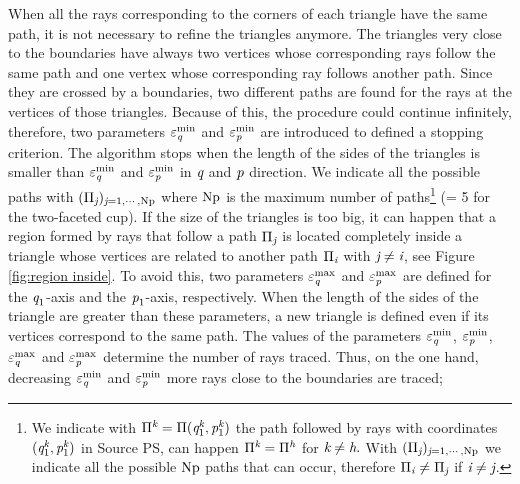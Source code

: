 When all the rays corresponding to the corners of each triangle have the same path, it is not necessary to refine the triangles anymore.
The triangles very close to the boundaries have always two vertices whose corresponding rays follow the same path and one vertex whose corresponding ray follows another path.
Since they are crossed by a boundaries, two different paths are found for the rays at the vertices of those triangles. 
Because of this, the procedure could continue infinitely, therefore, two parameters $\varepsilon_{\textit{q}}^\textrm{min}$ and $\varepsilon_{\textit{p}}^\textrm{min}$ are introduced to defined a stopping criterion.
The algorithm stops when the length of the sides of the triangles is smaller than $\varepsilon_{\textit{q}}^\textrm{min}$ and $\varepsilon_{\textit{p}}^\textrm{min}$ in $\textit{q}$ and $\textit{p}$ direction.
We indicate all the possible paths with $(\Pi_{\textit{j}})_{\textit{j}=1, \cdots, \textrm{Np}}$ where $\textrm{Np}$ is the maximum number of paths\footnote{We indicate with $\Pi^{\textit{k}} = \Pi(\textit{q}_1^{\textit{k}},\textit{p}_1^{\textit{k}})$ the path followed by rays with coordinates $(\textit{q}_1^{\textit{k}},\textit{p}_1^{\textit{k}})$ in Source PS, 
can happen $\Pi^{\textit{k}}= \Pi^{\textit{h}}$ for $\textit{k}\neq\textit{h}.$
With $(\Pi_{\textit{j}})_{\textit{j}=1, \cdots, \textrm{Np}}$ we indicate all the possible $\textrm{Np}$ paths that can occur, therefore $\Pi_{\textit{i}}\neq\Pi_{\textit{j}}$ if $\textit{i}\neq\textit{j}$.} (\npath = 5 for the two-faceted cup).
If the size of the triangles is too big, it can happen that a region formed by rays that follow a path $\Pi_{\textit{j}}$ is located completely inside a triangle whose vertices are related to another path $\Pi_{\textit{i}}$ with $\textit{j} \neq  \textit{i}$, see Figure \ref{fig:region inside}.
To avoid this, two parameters $\varepsilon_{\textit{q}}^{\textrm{max}}$ and $\varepsilon_{\textit{p}}^{\textrm{max}}$ are defined for the $\textit{q}_1$-axis and the $\textit{p}_1$-axis, respectively.
When the length of the sides of the triangle are greater than these parameters, a new triangle is defined even if its vertices correspond to the same path.
The values of the parameters $\varepsilon_{\textit{q}}^\textrm{min}$, $\varepsilon_{\textit{p}}^\textrm{min}$, $\varepsilon_{\textit{q}}^\textrm{max}$ and $\varepsilon_{\textit{p}}^\textrm{max}$ determine the number of rays traced.
Thus, on the one hand, decreasing $\varepsilon_{\textit{q}}^\textrm{min}$ and $\varepsilon_{\textit{p}}^\textrm{min}$ more rays close to the boundaries are traced;
